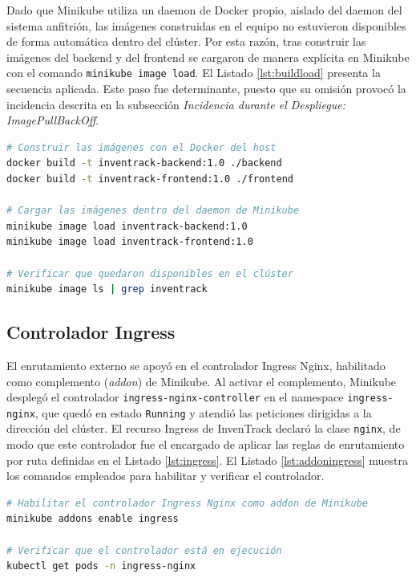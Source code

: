 \documentclass[stu,11pt,spanish,floatsintext]{apa7}
\begin{document}
Dado que Minikube utiliza un daemon de Docker propio, aislado del daemon del sistema anfitrión, las imágenes construidas en el equipo no estuvieron disponibles de forma automática dentro del clúster. Por esta razón, tras construir las imágenes del backend y del frontend se cargaron de manera explícita en Minikube con el comando \texttt{minikube image load}. El Listado \ref{lst:buildload} presenta la secuencia aplicada. Este paso fue determinante, puesto que su omisión provocó la incidencia descrita en la subsección \emph{Incidencia durante el Despliegue: ImagePullBackOff}.

\begin{lstlisting}[language=bash,caption={Construcción y carga de las imágenes en Minikube},label=lst:buildload]
# Construir las imágenes con el Docker del host
docker build -t inventrack-backend:1.0 ./backend
docker build -t inventrack-frontend:1.0 ./frontend

# Cargar las imágenes dentro del daemon de Minikube
minikube image load inventrack-backend:1.0
minikube image load inventrack-frontend:1.0

# Verificar que quedaron disponibles en el clúster
minikube image ls | grep inventrack
\end{lstlisting}

\subsection{Controlador Ingress}

El enrutamiento externo se apoyó en el controlador Ingress Nginx, habilitado como complemento (\textit{addon}) de Minikube. Al activar el complemento, Minikube desplegó el controlador \texttt{ingress-nginx-controller} en el namespace \texttt{ingress-nginx}, que quedó en estado \texttt{Running} y atendió las peticiones dirigidas a la dirección del clúster. El recurso Ingress de InvenTrack declaró la clase \texttt{nginx}, de modo que este controlador fue el encargado de aplicar las reglas de enrutamiento por ruta definidas en el Listado \ref{lst:ingress}. El Listado \ref{lst:addoningress} muestra los comandos empleados para habilitar y verificar el controlador.

\begin{lstlisting}[language=bash,caption={Habilitación y verificación del controlador Ingress Nginx},label=lst:addoningress]
# Habilitar el controlador Ingress Nginx como addon de Minikube
minikube addons enable ingress

# Verificar que el controlador está en ejecución
kubectl get pods -n ingress-nginx
\end{lstlisting}
\end{document}
